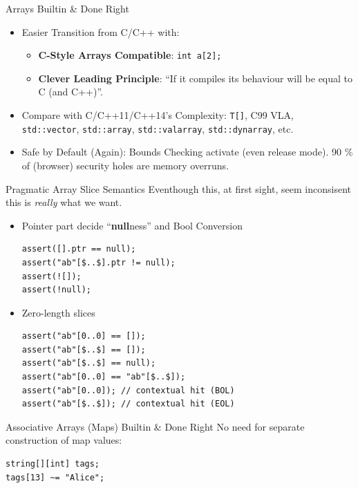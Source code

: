 \documentclass[xcolor=dvipsnames]{beamer}
\begin{document}
\begin{frame}[fragile]{Arrays Builtin \& Done Right}
  \begin{itemize}[<+->]
  \item Easier Transition from C/C++ with:
    \begin{itemize}[<+->]
    \item \textbf{C-Style Arrays Compatible}: \texttt{int a[2];}
    \item \textbf{Clever Leading Principle}: ``If it compiles its behaviour will be
      equal to C (and C++)''.
    \end{itemize}
  \item Compare with C/C++11/C++14’s Complexity: \texttt{T[]}, C99 VLA,
    \texttt{std::vector}, \texttt{std::array}, \texttt{std::valarray},
    \texttt{std::dynarray}, etc.
  \item Safe by Default (Again): Bounds Checking activate (even release
    mode). 90 \% of (browser) security holes are memory overruns.
  \end{itemize}
\end{frame}

\begin{frame}[fragile]{Pragmatic Array Slice Semantics}
  Eventhough this, at first sight, seem inconsisent this is \emph{really} what
  we want.
  \begin{itemize}[<+->]

  \item Pointer part decide ``\textbf{null}ness'' and Bool Conversion
    \begin{lstlisting}[frame=single]
assert([].ptr == null);
assert("ab"[$..$].ptr != null);
assert(![]);
assert(!null);
    \end{lstlisting}

  \item Zero-length slices
    \begin{lstlisting}[frame=single]
assert("ab"[0..0] == []);
assert("ab"[$..$] == []);
assert("ab"[$..$] == null);
assert("ab"[0..0] == "ab"[$..$]);
assert("ab"[0..0]); // contextual hit (BOL)
assert("ab"[$..$]); // contextual hit (EOL)
    \end{lstlisting}

  \end{itemize}
\end{frame}

\begin{frame}[fragile]{Associative Arrays (Maps) Builtin \& Done Right}
  No need for separate construction of map values:
  \begin{lstlisting}[frame=single]
string[][int] tags;
tags[13] ~= "Alice";
  \end{lstlisting}
\end{frame}
\end{document}
